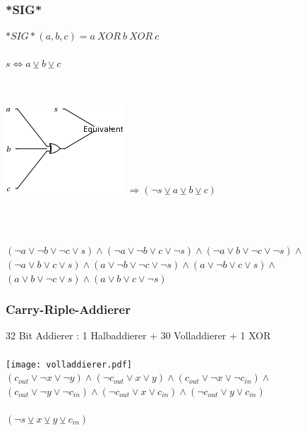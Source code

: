 \documentclass{beamer}
\begin{document}
    \begin{frame}
      \frametitle{*SIG*}
      $ *SIG*(a, b, c) = a~XOR~b~XOR~c $\\
      ~\\
      $ s \Leftrightarrow a \veebar b \veebar c $\\
      ~\\      
      \begin{columns}[C]
        \includegraphics[scale=0.5]{sig.png}
        $ \Rightarrow (\neg s \veebar a \veebar b \veebar c) $
      \end{columns}
      ~\\
      ~\\
      $ (\neg a \vee \neg b \vee \neg c \vee s) \wedge (\neg a \vee \neg b \vee c \vee \neg s) \wedge (\neg a \vee b \vee \neg c \vee \neg s) \wedge$\\
      $ (\neg a \vee b \vee c \vee s) \wedge (a \vee \neg b \vee \neg c \vee \neg s) \wedge (a \vee \neg b \vee c \vee s) \wedge $\\
      $ (a \vee b \vee \neg c \vee s) \wedge (a \vee b \vee c \vee \neg s) $
    \end{frame}
    \begin{frame}
      \frametitle{Carry-Riple-Addierer}
      32 Bit Addierer : 1 Halbaddierer + 30 Volladdierer + 1 XOR\\
      ~\\
      \texttt{[image: volladdierer.pdf]}\\
      $ (c_{out} \vee \neg x \vee \neg y) \wedge (\neg c_{out} \vee x \vee y) \wedge (c_{out} \vee \neg x \vee \neg c_{in}) \wedge $\\
      $ (c_{out} \vee \neg y \vee \neg c_{in}) \wedge (\neg c_{out} \vee x \vee c_{in}) \wedge (\neg c_{out} \vee y \vee c_{in}) $\\
      ~\\
      $ (\neg s \veebar x \veebar y \veebar c_{in})$\\
    \end{frame}
\end{document}
